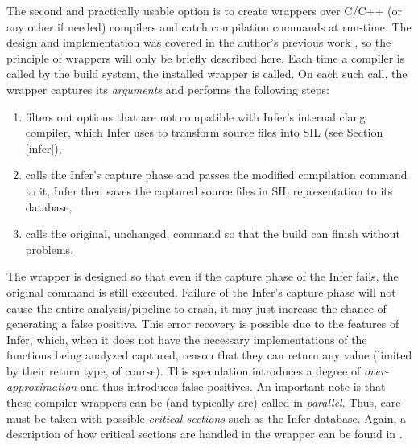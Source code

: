 The second and practically usable option is to create wrappers over C/C++ (or any other if needed) compilers and catch compilation commands at run-time. The design and implementation was covered in the author's previous work \cite{bc}, so the principle of wrappers will only be briefly described here. Each time a compiler is called by the build system, the installed wrapper is called. On each such call, the wrapper captures its \textit{arguments} and performs the following steps:

\begin{enumerate}
    \item filters out options that are not compatible with Infer's internal clang compiler, which Infer uses to transform source files into SIL (see Section \ref{infer}),
    \item calls the Infer's capture phase and passes the modified compilation command to it, Infer then saves the captured source files in SIL representation to its database,
    \item calls the original, unchanged, command so that the build can finish without problems.
\end{enumerate}

The wrapper is designed so that even if the capture phase of the Infer fails, the original command is still executed. Failure of the Infer's capture phase will not cause the entire analysis/pipeline to crash, it may just increase the chance of generating a false positive. This error recovery is possible due to the features of Infer, which, when it does not have the necessary implementations of the functions being analyzed captured, reason that they can return any value (limited by their return type, of course). This speculation introduces a degree of \textit{over-approximation} and thus introduces false positives. An important note is that these compiler wrappers can be (and typically are) called in \textit{parallel}. Thus, care must be taken with possible \textit{critical sections} such as the Infer database. Again, a description of how critical sections are handled in the wrapper can be found in \cite{bc}.

